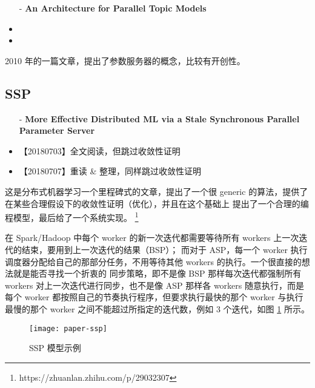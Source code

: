 \begin{itemize}
	\item [-] \textbf{An Architecture for Parallel Topic Models}
\end{itemize}

\begin{itemize}
	\item %
	\item 
\end{itemize}

2010 年的一篇文章，提出了参数服务器的概念，比较有开创性。

\subsection{SSP}\label{paper:ssp}

\begin{itemize}
	\item [-] \textbf{More Effective Distributed ML via a Stale Synchronous Parallel Parameter Server}
\end{itemize}

\begin{itemize}
	\item 【20180703】全文阅读，但跳过收敛性证明
	\item 【20180707】重读 \& 整理，同样跳过收敛性证明
\end{itemize}

这是分布式机器学习一个里程碑式的文章，提出了一个很 generic 的算法，提供了在某些合理假设下的收敛性证明（优化），并且在这个基础上
提出了一个合理的编程模型，最后给了一个系统实现。%
\footnote{https://zhuanlan.zhihu.com/p/29032307}%

在 Spark/Hadoop 中每个 worker 的新一次迭代都需要等待所有 workers 上一次迭代的结束，要用到上一次迭代的结果（BSP）；
而对于 ASP，每一个 worker 执行调度器分配给自己的那部分任务，不用等待其他 workers 的执行。一个很直接的想法就是能否寻找一个折衷的
同步策略，即不是像 BSP 那样每次迭代都强制所有 workers 对上一次迭代进行同步，也不是像 ASP 那样各 workers 随意执行，而是每个 worker
都按照自己的节奏执行程序，但要求执行最快的那个 worker 与执行最慢的那个 worker 之间不能超过所指定的迭代数，例如 3 个迭代，如图
\ref{fig:paper-ssp} 所示。 

\begin{figure}[hbtp]
\centering
\texttt{[image: paper-ssp]}
\caption{SSP 模型示例}
\label{fig:paper-ssp}
\end{figure}

